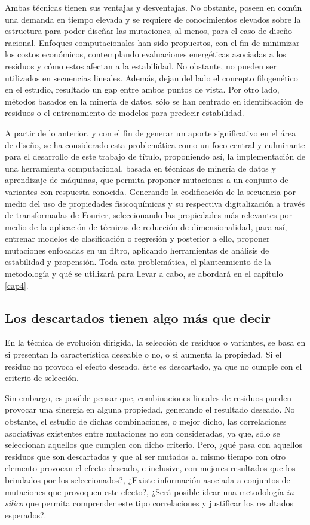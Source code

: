 Ambas técnicas tienen sus ventajas y desventajas. No obstante, poseen en común una demanda en tiempo elevada y se requiere de conocimientos elevados sobre la estructura para poder diseñar las mutaciones, al menos, para el caso de diseño racional. Enfoques computacionales han sido propuestos, con el fin de minimizar los costos económicos, contemplando evaluaciones energéticas asociadas a los residuos y cómo estos afectan a la estabilidad. No obstante, no pueden ser utilizados en secuencias lineales. Además, dejan del lado el concepto filogenético en el estudio, resultado un gap entre ambos puntos de vista. Por otro lado, métodos basados en la minería de datos, sólo se han centrado en identificación de residuos o el entrenamiento de modelos para predecir estabilidad.

A partir de lo anterior, y con el fin de generar un aporte significativo en el área de diseño, se ha considerado esta problemática como un foco central y culminante para el desarrollo de este trabajo de título, proponiendo así, la implementación de una herramienta computacional, basada en técnicas de minería de datos y aprendizaje de máquinas, que permita proponer mutaciones a un conjunto de variantes con respuesta conocida. Generando la codificación de la secuencia por medio del uso de propiedades fisicoquímicas y su respectiva digitalización a través de transformadas de Fourier, seleccionando las propiedades más relevantes por medio de la aplicación de técnicas de reducción de dimensionalidad, para así, entrenar modelos de clasificación o regresión y posterior a ello, proponer mutaciones enfocadas en un filtro, aplicando herramientas de análisis de estabilidad y propensión. Toda esta problemática, el planteamiento de la metodología y qué se utilizará para llevar a cabo, se abordará en el capítulo \ref{cap4}.


\subsection{Los descartados tienen algo más que decir}

En la técnica de evolución dirigida, la selección de residuos o variantes, se basa en si presentan la característica deseable o no, o si aumenta la propiedad. Si el residuo no provoca el efecto deseado, éste es descartado, ya que no cumple con el criterio de selección.

Sin embargo, es posible pensar que, combinaciones lineales de residuos pueden provocar una sinergia en alguna propiedad, generando el resultado deseado. No obstante, el estudio de dichas combinaciones, o mejor dicho, las correlaciones asociativas existentes entre mutaciones no son consideradas, ya que, sólo se seleccionan aquellos que cumplen con dicho criterio. Pero, ¿qué pasa con aquellos residuos que son descartados y que al ser mutados al mismo tiempo con otro elemento provocan el efecto deseado, e inclusive, con mejores resultados que los brindados por los seleccionados?, ¿Existe información asociada a conjuntos de mutaciones que provoquen este efecto?, ¿Será posible idear una metodología \textit{in-silico} que permita comprender este tipo correlaciones y justificar los resultados esperados?.


